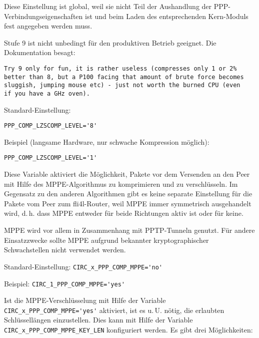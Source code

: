 \begin{description}
Diese Einstellung ist global, weil sie nicht Teil der Aushandlung der
PPP-Verbindungs\-eigenschaften ist und beim Laden des entsprechenden Kern-Moduls
fest angegeben werden muss.

Stufe 9 ist nicht unbedingt für den produktiven Betrieb geeignet. Die
Dokumentation besagt:

\begin{verbatim}
Try 9 only for fun, it is rather useless (compresses only 1 or 2%
better than 8, but a P100 facing that amount of brute force becomes
sluggish, jumping mouse etc) - just not worth the burned CPU (even
if you have a GHz oven).
\end{verbatim}

Standard-Einstellung:

\verb+PPP_COMP_LZSCOMP_LEVEL='8'+

Beispiel (langsame Hardware, nur schwache Kompression möglich):

\verb+PPP_COMP_LZSCOMP_LEVEL='1'+


Diese Variable aktiviert die Möglichkeit, Pakete vor dem Versenden an den Peer
mit Hilfe des MPPE-Algorithmus zu komprimieren und zu verschlüsseln. Im
Gegensatz zu den anderen Algorithmen gibt es keine separate Einstellung für
die Pakete vom Peer zum fli4l-Router, weil MPPE immer symmetrisch ausgehandelt
wird, d.\,h. dass MPPE entweder für beide Richtungen aktiv ist oder für keine.

MPPE wird vor allem in Zusammenhang mit PPTP-Tunneln genutzt. Für andere
Einsatzzwecke sollte MPPE aufgrund bekannter kryptographischer Schwachstellen
nicht verwendet werden.

Standard-Einstellung: \verb+CIRC_x_PPP_COMP_MPPE='no'+

Beispiel: \verb+CIRC_1_PPP_COMP_MPPE='yes'+


Ist die MPPE-Verschlüsselung mit Hilfe der Variable
\verb+CIRC_x_PPP_COMP_MPPE='yes'+ aktiviert, ist es u.\,U. nötig, die
erlaubten Schlüssellängen einzustellen. Dies kann mit Hilfe der
Variable \verb+CIRC_x_PPP_COMP_MPPE_KEY_LEN+ konfiguriert werden. Es gibt drei
Möglichkeiten:


\end{description}
